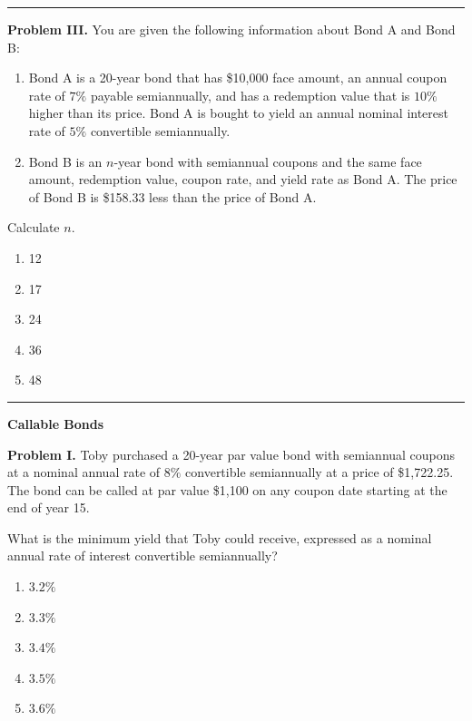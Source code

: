 \documentclass[11pt]{article}
\begin{document}
\medskip
\hrule

\textbf{Problem III.} You are given the following information about Bond A and Bond B:

\begin{enumerate}[label=\roman*.]
    \item Bond A is a 20-year bond that has \$10{,}000 face amount, an annual coupon rate of \(7\%\) payable semiannually, and has a redemption value that is \(10\%\) higher than its price. Bond A is bought to yield an annual nominal interest rate of \(5\%\) convertible semiannually.
    
    \item Bond B is an \(n\)-year bond with semiannual coupons and the same face amount, redemption value, coupon rate, and yield rate as Bond A. The price of Bond B is \$158.33 less than the price of Bond A.
\end{enumerate}

Calculate \(n\).

\begin{enumerate}[label=\Alph*.]
    \item 12
    \item 17
    \item 24
    \item 36
    \item 48
\end{enumerate}

\medskip
\hrule

\newpage

\begin{center}
\begin{LARGE}
\textbf{Callable Bonds}
\end{LARGE}
\end{center}


\textbf{Problem I.} Toby purchased a 20-year par value bond with semiannual coupons at a nominal annual rate of \(8\%\) convertible semiannually at a price of \$1{,}722.25. The bond can be called at par value \$1{,}100 on any coupon date starting at the end of year 15.

What is the minimum yield that Toby could receive, expressed as a nominal annual rate of interest convertible semiannually?

\begin{enumerate}[label=\Alph*.]
    \item \(3.2\%\)
    \item \(3.3\%\)
    \item \(3.4\%\)
    \item \(3.5\%\)
    \item \(3.6\%\)
\end{enumerate}
\end{document}
